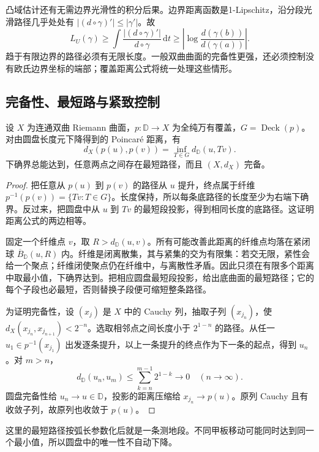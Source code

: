 \ProseParagraphBreak
凸域估计还有无需边界光滑性的积分后果。边界距离函数是1-Lipschitz，沿分段光滑路径几乎处处有 \(|(d\circ\gamma)'|\le|\gamma'|\)。故
\[
 L_U(\gamma)\ge\int\frac{|(d\circ\gamma)'|}{d\circ\gamma}\,\mathrm dt
 \ge\left|\log\frac{d(\gamma(b))}{d(\gamma(a))}\right|.
\]
趋于有限边界的路径必须有无限长度。一般双曲曲面的完备性更强，还必须控制没有欧氏边界坐标的端部；覆盖距离公式将统一处理这些情形。

\subsection{完备性、最短路与紧致控制}
\label{b3:subsec:130405}

\begin{theorem}[覆盖距离公式与完备性]\label{b3:thm:13-hyperbolic-complete}
设 \(X\) 为连通双曲 Riemann 曲面，\(p:\mathbb D\to X\) 为全纯万有覆盖，\(G=\operatorname{Deck}(p)\)。对由圆盘长度元下降得到的 Poincaré 距离，有
\[
 d_X(p(u),p(v))=\inf_{T\in G}d_{\mathbb D}(u,Tv).
\]
下确界总能达到，任意两点之间存在最短路径，而且 \((X,d_X)\) 完备。
\end{theorem}
\begin{proof}
把任意从 \(p(u)\) 到 \(p(v)\) 的路径从 \(u\) 提升，终点属于纤维 \(p^{-1}(p(v))=\{Tv:T\in G\}\)。长度保持，所以每条底路径的长度至少为右端下确界。反过来，把圆盘中从 \(u\) 到 \(Tv\) 的最短段投影，得到相同长度的底路径。这证明距离公式的两边相等。

固定一个纤维点 \(v\)，取 \(R>d_{\mathbb D}(u,v)\)。所有可能改善此距离的纤维点均落在紧闭球 \(\overline B_{\mathbb D}(u,R)\) 内。纤维是闭离散集，其与紧集的交为有限集：若交无限，紧性会给一个聚点；纤维闭使聚点仍在纤维中，与离散性矛盾。因此只须在有限多个距离中取最小值，下确界达到。把相应圆盘最短段投影，给出底曲面的最短路径；它的每个子段也必最短，否则替换子段便可缩短整条路径。

为证明完备性，设 \((x_j)\) 是 \(X\) 中的 Cauchy 列，抽取子列 \((x_{j_n})\)，使 \(d_X(x_{j_n},x_{j_{n+1}})<2^{-n}\)。选取相邻点之间长度小于 \(2^{1-n}\) 的路径。从任一 \(u_1\in p^{-1}(x_{j_1})\) 出发逐条提升，以上一条提升的终点作为下一条的起点，得到 \(u_n\)。对 \(m>n\)，
\[
 d_{\mathbb D}(u_n,u_m)\le\sum_{k=n}^{m-1}2^{1-k}\longrightarrow0
 \quad(n\to\infty).
\]
圆盘完备性给 \(u_n\to u\in\mathbb D\)，投影的距离压缩给 \(x_{j_n}\to p(u)\)。原列 Cauchy 且有收敛子列，故原列也收敛于 \(p(u)\)。
\end{proof}
这里的最短路径按弧长参数化后就是一条测地段。不同甲板移动可能同时达到同一个最小值，所以圆盘中的唯一性不自动下降。

